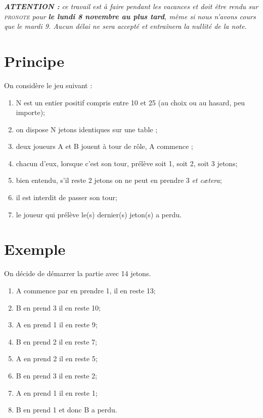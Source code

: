 \documentclass[a4paper,12pt]{book}
\begin{document}

\begin{center}
\textit{\textbf{ATTENTION : } ce travail est à faire pendant les vacances et doit être rendu sur \textsc{pronote} pour \textbf{le lundi 8 novembre au plus tard}, même si nous n'avons cours que le mardi 9. Aucun délai ne sera accepté et entraînera la nullité de la note.}
\end{center}

\section*{Principe}
On considère le jeu suivant :
\begin{enumerate}[--]
    \item N est un entier positif compris entre 10 et 25 (au choix ou au hasard, peu importe);
	\item on dispose N jetons identiques sur une table ;
	\item deux joueurs A et B jouent à tour de rôle, A commence ;
	\item chacun d'eux, lorsque c'est son tour, prélève soit 1, soit 2, soit 3 jetons;
    \item bien entendu, s'il reste 2 jetons on ne peut en prendre 3 \textit{et c\ae tera};
    \item il est interdit de passer son tour;
	\item le joueur qui prélève le(s) dernier(s) jeton(s) a perdu.
    
\end{enumerate}

\section*{Exemple}
On décide de démarrer la partie avec 14 jetons.
\begin{enumerate}[--]
	\item 	A commence par en prendre 1, il en reste 13;
	\item 	B en prend 3 il en reste 10;
	\item 	A en prend 1 il en reste 9;
	\item 	B en prend 2 il en reste 7;
	\item 	A en prend 2 il en reste 5;
	\item 	B en prend 3 il en reste 2;
	\item 	A en prend 1 il en reste 1;
	\item  	B en prend 1 et donc B a perdu.
\end{enumerate}
\end{document}
